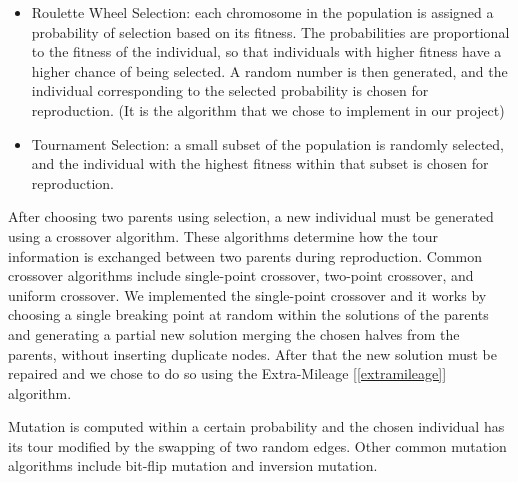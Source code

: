 \begin{itemize}
    \item Roulette Wheel Selection: each chromosome in the population is assigned a probability of selection based on its fitness. The probabilities are proportional to the fitness of the individual, so that individuals with higher fitness have a higher chance of being selected. A random number is then generated, and the individual corresponding to the selected probability is chosen for reproduction. (It is the algorithm that we chose to implement in our project)
    \item Tournament Selection: a small subset of the population is randomly selected, and the individual with the highest fitness within that subset is chosen for reproduction.
\end{itemize}

After choosing two parents using selection, a new individual must be generated using a crossover algorithm. 
These algorithms determine how the tour information is exchanged between two parents during reproduction. Common crossover algorithms include single-point crossover, two-point crossover, and uniform crossover.
We implemented the single-point crossover and it works by choosing a single breaking point at random within the solutions of the parents and generating a partial new solution merging the chosen halves from the parents, without inserting duplicate nodes.
After that the new solution must be repaired and we chose to do so using the Extra-Mileage [\ref{extramileage}] algorithm.

Mutation is computed within a certain probability and the chosen individual has its tour modified by the swapping of two random edges. Other common mutation algorithms include bit-flip mutation and inversion mutation.








